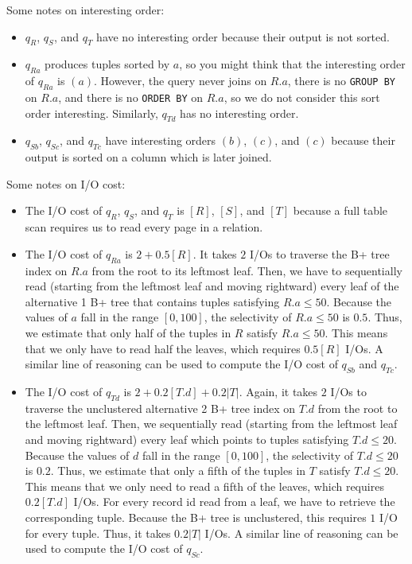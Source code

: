 \documentclass{article}
\begin{document}
Some notes on interesting order:
\begin{itemize}
  \item
    $q_R$, $q_S$, and $q_T$ have no interesting order because their output is
    not sorted.
  \item
    $q_{Ra}$ produces tuples sorted by $a$, so you might think that the
    interesting order of $q_{Ra}$ is $(a)$. However, the query never joins on
    $R.a$, there is no \texttt{GROUP BY} on $R.a$, and there is no
    \texttt{ORDER BY} on $R.a$, so we do not consider this sort order
    interesting. Similarly, $q_{Td}$ has no interesting order.
  \item
    $q_{Sb}$, $q_{Sc}$, and $q_{Tc}$ have interesting orders $(b)$, $(c)$, and
    $(c)$ because their output is sorted on a column which is later joined.
\end{itemize}

Some notes on I/O cost:
\begin{itemize}
  \item
    The I/O cost of $q_{R}$, $q_{S}$, and $q_{T}$ is $[R]$, $[S]$, and $[T]$
    because a full table scan requires us to read every page in a relation.
  \item
    The I/O cost of $q_{Ra}$ is $2 + 0.5[R]$. It takes $2$ I/Os to traverse the
    B+ tree index on $R.a$ from the root to its leftmost leaf. Then, we have to
    sequentially read (starting from the leftmost leaf and moving rightward)
    every leaf of the alternative 1 B+ tree that contains tuples satisfying
    $R.a \leq 50$. Because the values of $a$ fall in the range $[0, 100]$, the
    selectivity of $R.a \leq 50$ is $0.5$. Thus, we estimate that only half of
    the tuples in $R$ satisfy $R.a \leq 50$. This means that we only have to
    read half the leaves, which requires $0.5[R]$ I/Os. A similar line of
    reasoning can be used to compute the I/O cost of $q_{Sb}$ and $q_{Tc}$.

  \item
    The I/O cost of $q_{Td}$ is $2 + 0.2[T.d] + 0.2|T|$.  Again, it takes $2$
    I/Os to traverse the unclustered alternative 2 B+ tree index on $T.d$ from
    the root to the leftmost leaf. Then, we sequentially read (starting from
    the leftmost leaf and moving rightward) every leaf which points to tuples
    satisfying $T.d \leq 20$. Because the values of $d$ fall in the range $[0,
    100]$, the selectivity of $T.d \leq 20$ is $0.2$. Thus, we estimate that
    only a fifth of the tuples in $T$ satisfy $T.d \leq 20$. This means that we
    only need to read a fifth of the leaves, which requires $0.2[T.d]$ I/Os.
    For every record id read from a leaf, we have to retrieve the corresponding
    tuple. Because the B+ tree is unclustered, this requires $1$ I/O for every
    tuple. Thus, it takes $0.2|T|$ I/Os. A similar line of reasoning can be
    used to compute the I/O cost of $q_{Sc}$.
\end{itemize}
\end{document}
